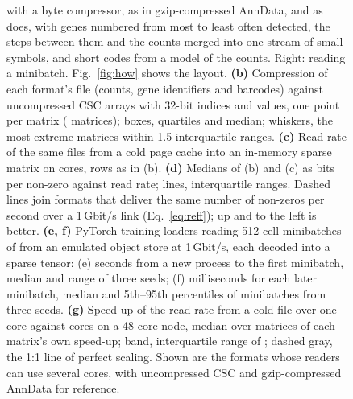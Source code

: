 \begin{figure}[tbp]
{with a byte compressor, as in gzip-compressed AnnData, and as \sone{} does, with genes numbered from most to least often detected, the steps between them and the counts merged into one
stream of small symbols, and short codes from a model of the counts. Right: reading a minibatch. Fig.~\ref{fig:how} shows
the layout.
\textbf{(b)} Compression of each format's file (counts, gene identifiers and barcodes) against uncompressed CSC arrays with
32-bit indices and values, one point per matrix ( matrices); boxes, quartiles and median; whiskers, the most
extreme matrices within 1.5 interquartile ranges.
\textbf{(c)} Read rate of the same files from a cold page cache into an in-memory sparse matrix on 
cores, rows as in (b).
\textbf{(d)} Medians of (b) and (c) as bits per non-zero against read rate; lines, interquartile ranges. Dashed lines
join formats that deliver the same number of non-zeros per second over a 1\,Gbit/s link (Eq.~\ref{eq:reff}); up and to
the left is better.
\textbf{(e, f)} PyTorch training loaders reading 512-cell minibatches of  from an emulated object store
at 1\,Gbit/s, each decoded into a sparse tensor: (e) seconds from a new process to the first minibatch, median and range
of three seeds; (f) milliseconds for each later minibatch, median and 5th--95th percentiles of 
minibatches from three seeds.
\textbf{(g)} Speed-up of the read rate from a cold file over one core against cores on a 48-core node, median over
 matrices of each matrix's own speed-up; band, interquartile range of \sone; dashed gray, the 1:1 line of
perfect scaling. Shown are the formats whose readers can use several cores, with uncompressed CSC and gzip-compressed
AnnData for reference.}
\label{fig:wow}
\end{figure}
